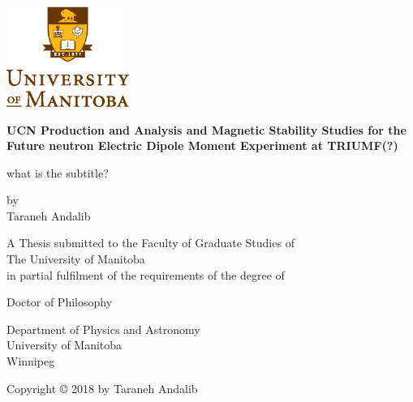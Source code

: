 \documentclass[12pt,a4paper]{book}
\begin{document}

\noindent
\begin{titlepage}
  \begin{center}
         \includegraphics[width=0.3\textwidth]{university.eps}\\
        \vspace*{1cm}
        
        \textbf{UCN Production and Analysis and Magnetic Stability
          Studies for the Future neutron Electric Dipole Moment
          Experiment at TRIUMF(?)}
        
        \vspace{0.5cm}
        what is the subtitle?
        
        \vspace{1.5cm}
        
        by\\
        \vspace{1.0cm}
        Taraneh Andalib

        \vspace{2.5cm}
        A Thesis submitted to the Faculty of Graduate Studies of\\
        \vspace{0.5cm}
        The University of Manitoba\\
        \vspace{0.5cm}
        in partial fulfilment of the requirements of the degree of
        
        \vspace{2.0cm}
        
       
        Doctor of Philosophy\\
       \vspace{0.5cm}
        
   
        \vspace{0.5cm}
        Department of Physics and Astronomy\\
        University of Manitoba\\
        Winnipeg

        \vspace{3.0cm}
        Copyright © 2018 by Taraneh Andalib
        
    \end{center}
\end{titlepage}
\end{document}
